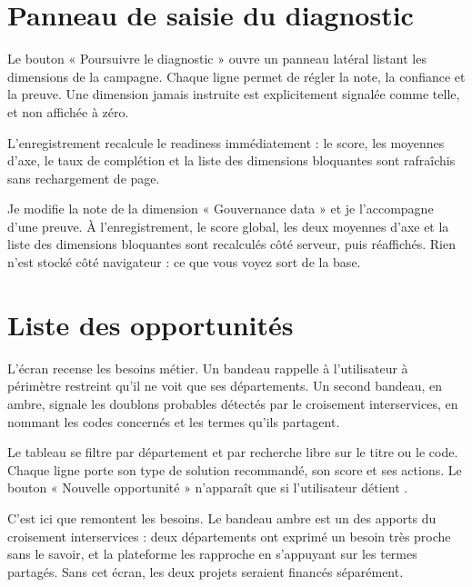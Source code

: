 \section{Panneau de saisie du diagnostic}

Le bouton « Poursuivre le diagnostic » ouvre un panneau latéral listant les dimensions
de la campagne. Chaque ligne permet de régler la note, la confiance et la preuve. Une
dimension jamais instruite est explicitement signalée comme telle, et non affichée à
zéro.

L'enregistrement recalcule le readiness immédiatement : le score, les moyennes d'axe, le
taux de complétion et la liste des dimensions bloquantes sont rafraîchis sans
rechargement de page.


\begin{oral}
Je modifie la note de la dimension « Gouvernance data » et je l'accompagne d'une preuve.
À l'enregistrement, le score global, les deux moyennes d'axe et la liste des dimensions
bloquantes sont recalculés côté serveur, puis réaffichés. Rien n'est stocké côté
navigateur : ce que vous voyez sort de la base.
\end{oral}

\section{Liste des opportunités}

L'écran recense les besoins métier. Un bandeau rappelle à l'utilisateur à périmètre
restreint qu'il ne voit que ses départements. Un second bandeau, en ambre, signale les
doublons probables détectés par le croisement interservices, en nommant les codes
concernés et les termes qu'ils partagent.

Le tableau se filtre par département et par recherche libre sur le titre ou le code.
Chaque ligne porte son type de solution recommandé, son score et ses actions. Le bouton
« Nouvelle opportunité » n'apparaît que si l'utilisateur détient
.


\begin{oral}
C'est ici que remontent les besoins. Le bandeau ambre est un des apports du croisement
interservices : deux départements ont exprimé un besoin très proche sans le savoir, et
la plateforme les rapproche en s'appuyant sur les termes partagés. Sans cet écran, les
deux projets seraient financés séparément.
\end{oral}

